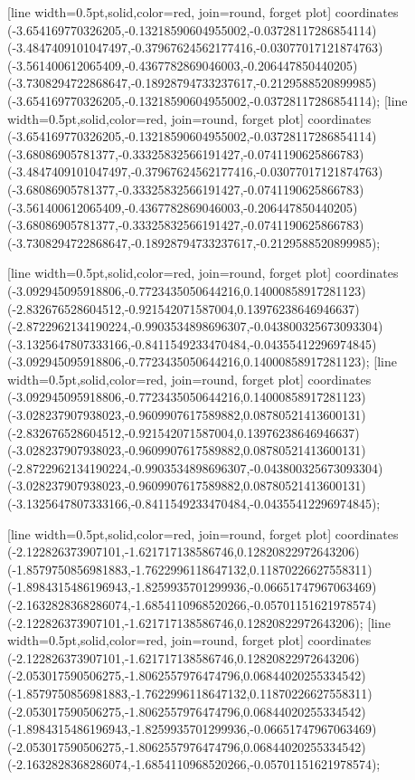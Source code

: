 [line width=0.5pt,solid,color=red, join=round, forget plot] coordinates {(-3.654169770326205,-0.13218590604955002,-0.03728117286854114) (-3.4847409101047497,-0.37967624562177416,-0.03077017121874763) (-3.561400612065409,-0.4367782869046003,-0.206447850440205) (-3.7308294722868647,-0.18928794733237617,-0.2129588520899985) (-3.654169770326205,-0.13218590604955002,-0.03728117286854114)};
[line width=0.5pt,solid,color=red, join=round, forget plot] coordinates {(-3.654169770326205,-0.13218590604955002,-0.03728117286854114) (-3.68086905781377,-0.33325832566191427,-0.0741190625866783) (-3.4847409101047497,-0.37967624562177416,-0.03077017121874763) (-3.68086905781377,-0.33325832566191427,-0.0741190625866783) (-3.561400612065409,-0.4367782869046003,-0.206447850440205) (-3.68086905781377,-0.33325832566191427,-0.0741190625866783) (-3.7308294722868647,-0.18928794733237617,-0.2129588520899985)};

[line width=0.5pt,solid,color=red, join=round, forget plot] coordinates {(-3.092945095918806,-0.7723435050644216,0.14000858917281123) (-2.832676528604512,-0.921542071587004,0.13976238646946637) (-2.8722962134190224,-0.9903534898696307,-0.043800325673093304) (-3.1325647807333166,-0.8411549233470484,-0.04355412296974845) (-3.092945095918806,-0.7723435050644216,0.14000858917281123)};
[line width=0.5pt,solid,color=red, join=round, forget plot] coordinates {(-3.092945095918806,-0.7723435050644216,0.14000858917281123) (-3.028237907938023,-0.9609907617589882,0.08780521413600131) (-2.832676528604512,-0.921542071587004,0.13976238646946637) (-3.028237907938023,-0.9609907617589882,0.08780521413600131) (-2.8722962134190224,-0.9903534898696307,-0.043800325673093304) (-3.028237907938023,-0.9609907617589882,0.08780521413600131) (-3.1325647807333166,-0.8411549233470484,-0.04355412296974845)};

[line width=0.5pt,solid,color=red, join=round, forget plot] coordinates {(-2.122826373907101,-1.621717138586746,0.12820822972643206) (-1.8579750856981883,-1.7622996118647132,0.11870226627558311) (-1.8984315486196943,-1.8259935701299936,-0.06651747967063469) (-2.1632828368286074,-1.6854110968520266,-0.05701151621978574) (-2.122826373907101,-1.621717138586746,0.12820822972643206)};
[line width=0.5pt,solid,color=red, join=round, forget plot] coordinates {(-2.122826373907101,-1.621717138586746,0.12820822972643206) (-2.053017590506275,-1.8062557976474796,0.06844020255334542) (-1.8579750856981883,-1.7622996118647132,0.11870226627558311) (-2.053017590506275,-1.8062557976474796,0.06844020255334542) (-1.8984315486196943,-1.8259935701299936,-0.06651747967063469) (-2.053017590506275,-1.8062557976474796,0.06844020255334542) (-2.1632828368286074,-1.6854110968520266,-0.05701151621978574)};

